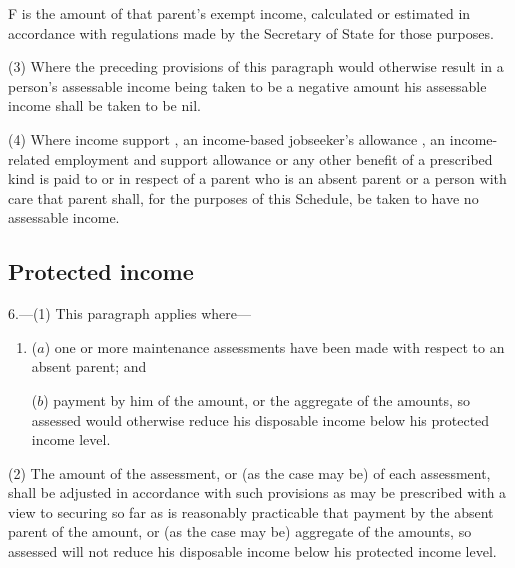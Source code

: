 \documentclass[a4paper]{article}
\begin{document}
{\begin{enumerate}
F is the amount of that parent’s exempt income, calculated or estimated in accordance with regulations made by the Secretary of State for those purposes.
\end{enumerate}

(3) Where the preceding provisions of this paragraph would otherwise result in a person’s assessable income being taken to be a negative amount his assessable income shall be taken to be nil.

(4) Where income support%
, an income-based jobseeker’s allowance%
, an income-related employment and support allowance
 or any other benefit of a prescribed kind is paid to or in respect of a parent who is an absent parent or a person with care that parent shall, for the purposes of this Schedule, be taken to have no assessable income.


\subsection*{Protected income}

6.---(1) This paragraph applies where---
\begin{enumerate}\item[]
($a$) one or more maintenance assessments have been made with respect to an absent parent; and

($b$) payment by him of the amount, or the aggregate of the amounts, so assessed would otherwise reduce his disposable income below his protected income level.
\end{enumerate}

(2) The amount of the assessment, or (as the case may be) of each assessment, shall be adjusted in accordance with such provisions as may be prescribed with a view to securing so far as is reasonably practicable that payment by the absent parent of the amount, or (as the case may be) aggregate of the amounts, so assessed will not reduce his disposable income below his protected income level.

}
\end{document}
